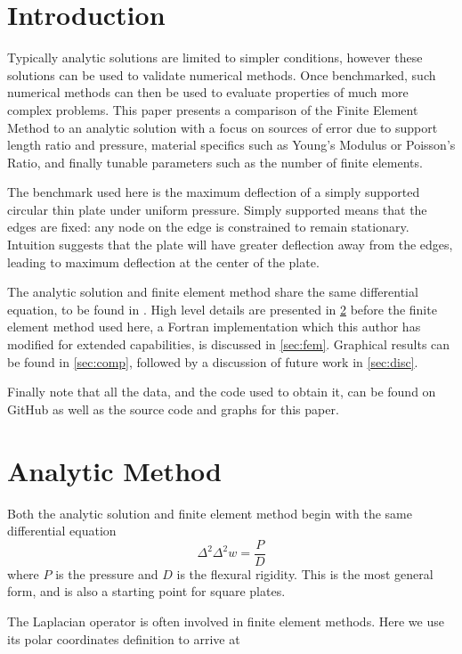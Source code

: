 \documentclass[12pt,times,twocolumn,3p]{elsarticle}
\begin{document}

\section{Introduction} \label{intro}
Typically analytic solutions are limited to simpler conditions, however these
solutions can be used to validate numerical methods. Once benchmarked, such
numerical methods can then be used to evaluate properties of much more complex problems.
This paper presents a comparison of the Finite Element Method to an analytic
solution with a focus on sources of error due to support length ratio and
pressure, material specifics such as Young's Modulus or Poisson's
Ratio, and finally tunable parameters such as the number of finite elements.

The benchmark used here is the maximum deflection of a simply supported circular
thin plate under uniform pressure. Simply supported means that the edges are
fixed: any node on the edge is constrained to remain stationary. Intuition
suggests that the plate will have greater deflection away from the edges,
leading to maximum deflection at the center of the plate.

The analytic solution and finite element method share the same differential
equation, to be found in \cite{zien,boresi}. High level details are presented in
\cref{sec:ana} before the finite element method used here, a Fortran implementation
\cite{geocities} which this author has modified for extended capabilities, is
discussed in \cref{sec:fem}. Graphical results can be found in \cref{sec:comp},
followed by a discussion of future work in \cref{sec:disc}.

Finally note that all the data, and the code used to obtain it, can be found
on GitHub \cite{github} as well as the source code and graphs for this paper.

\section{Analytic Method} \label{sec:ana}
Both the analytic solution and finite element method begin with the same
differential equation
\begin{equation} \label{eqn:dp}
\Delta^2\Delta^2 w = \frac{P}{D}
\end{equation}
where $P$ is the pressure and $D$ is the flexural rigidity. This is the most
general form, and is also a starting point for square plates.


The Laplacian operator is often involved in finite element methods. Here we use
its polar coordinates definition to arrive at
\end{document}
